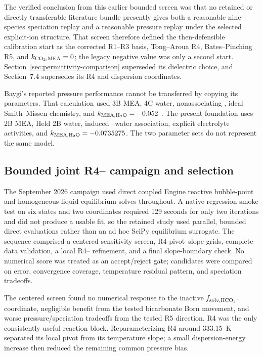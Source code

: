 \documentclass[10pt,oneside]{scrartcl}
\begin{document}
The verified conclusion from this earlier bounded screen was that no retained or directly transferable
literature bundle presently gives both a reasonable nine-species speciation
replay and a reasonable  pressure replay under the selected explicit-ion
structure. That screen therefore defined the then-defensible calibration start
as the corrected R1--R3 basis, Tong--Aroua R4, Bates--Pinching R5, and
$k_{\ce{CO2},\mathrm{MEA}}=0$; the legacy negative value was only a second
start. Section~\ref{sec:permittivity-comparison} superseded its dielectric
choice, and Section~7.4 supersedes its R4 and  dispersion coordinates.

Baygi's reported pressure performance cannot be transferred by copying its
parameters. That calculation used 3B MEA, 4C water, nonassociating ,
ideal Smith--Missen chemistry, and $k_{\mathrm{MEA},\ce{H2O}}=-0.052$
\cite{Baygi2015}. The present foundation uses 2B MEA, Held 2B water, induced
--water association, explicit electrolyte activities, and
$k_{\mathrm{MEA},\ce{H2O}}=-0.0735275$. The two parameter sets do not represent
the same model.

\subsection{Bounded joint R4-- campaign and selection}

The September 2026 campaign used direct coupled Engine reactive bubble-point
and homogeneous-liquid equilibrium solves throughout. A native-regression
smoke test on six states and two coordinates required 129 seconds for only two
iterations and did not produce a usable fit, so the retained study used
parallel, bounded direct evaluations rather than an ad hoc SciPy equilibrium
surrogate. The sequence comprised a centered sensitivity screen, R4
pivot--slope grids, complete-data validation, a local R4-- refinement,
and a final slope-boundary check. No numerical score was treated as an
accept/reject gate; candidates were compared on error, convergence coverage,
temperature residual pattern, and speciation tradeoffs.

The centered screen found no numerical response to the inactive
$f_{\mathrm{solv},\ce{HCO3-}}$ coordinate, negligible benefit from the tested
bicarbonate Born movement, and worse pressure/speciation tradeoffs from the
tested R5 direction. R4 was the only consistently useful reaction block.
Reparameterizing R4 around \SI{333.15}{\kelvin} separated its local pivot from
its temperature slope; a small  dispersion-energy increase then
reduced the remaining common pressure bias.
\end{document}
